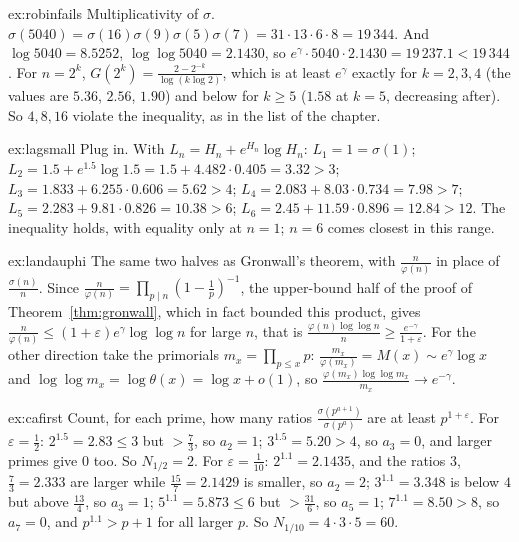 \begin{solution}{ex:robinfails}
\idea Multiplicativity of $\sigma$.
\writeup $\sigma(5040)=\sigma(16)\sigma(9)\sigma(5)\sigma(7)=31\cdot13\cdot6\cdot8=19\,344$. And $\log5040=8.5252$, $\log\log5040=2.1430$, so
$e^\gamma\cdot5040\cdot2.1430=19\,237.1<19\,344$. For $n=2^k$, $G(2^k)=\frac{2-2^{-k}}{\log(k\log2)}$, which is at least $e^\gamma$ exactly for $k=2,3,4$ (the values are
$5.36$, $2.56$, $1.90$) and below for $k\ge5$ ($1.58$ at $k=5$, decreasing after). So $4,8,16$ violate the inequality, as in the list of the chapter.
\end{solution}

\begin{solution}{ex:lagsmall}
\idea Plug in.
\writeup With $L_n=H_n+e^{H_n}\log H_n$: $L_1=1=\sigma(1)$; $L_2=1.5+e^{1.5}\log1.5=1.5+4.482\cdot0.405=3.32>3$; $L_3=1.833+6.255\cdot0.606=5.62>4$;
$L_4=2.083+8.03\cdot0.734=7.98>7$; $L_5=2.283+9.81\cdot0.826=10.38>6$; $L_6=2.45+11.59\cdot0.896=12.84>12$. The inequality holds, with equality only at $n=1$; $n=6$
comes closest in this range.
\end{solution}

\begin{solution}{ex:landauphi}
\idea The same two halves as Gronwall's theorem, with $\frac n{\varphi(n)}$ in place of $\frac{\sigma(n)}n$.
\writeup Since $\frac n{\varphi(n)}=\prod_{p\mid n}(1-\frac1p)^{-1}$, the upper-bound half of the proof of Theorem~\ref{thm:gronwall}, which in fact bounded this product, gives
$\frac n{\varphi(n)}\le(1+\varepsilon)e^\gamma\log\log n$ for large $n$, that is $\frac{\varphi(n)\log\log n}n\ge\frac{e^{-\gamma}}{1+\varepsilon}$. For the other direction take the
primorials $m_x=\prod_{p\le x}p$: $\frac{m_x}{\varphi(m_x)}=M(x)\sim e^\gamma\log x$ and $\log\log m_x=\log\theta(x)=\log x+o(1)$, so
$\frac{\varphi(m_x)\log\log m_x}{m_x}\to e^{-\gamma}$.
\end{solution}

\begin{solution}{ex:cafirst}
\idea Count, for each prime, how many ratios $\frac{\sigma(p^{a+1})}{\sigma(p^a)}$ are at least $p^{1+\varepsilon}$.
\writeup For $\varepsilon=\frac12$: $2^{1.5}=2.83\le3$ but $>\frac73$, so $a_2=1$; $3^{1.5}=5.20>4$, so $a_3=0$, and larger primes give $0$ too. So $N_{1/2}=2$.
For $\varepsilon=\frac1{10}$: $2^{1.1}=2.1435$, and the ratios $3$, $\frac73=2.333$ are larger while $\frac{15}7=2.1429$ is smaller, so $a_2=2$; $3^{1.1}=3.348$ is below
$4$ but above $\frac{13}4$, so $a_3=1$; $5^{1.1}=5.873\le6$ but $>\frac{31}6$, so $a_5=1$; $7^{1.1}=8.50>8$, so $a_7=0$, and $p^{1.1}>p+1$ for all larger $p$. So
$N_{1/10}=4\cdot3\cdot5=60$.
\end{solution}

